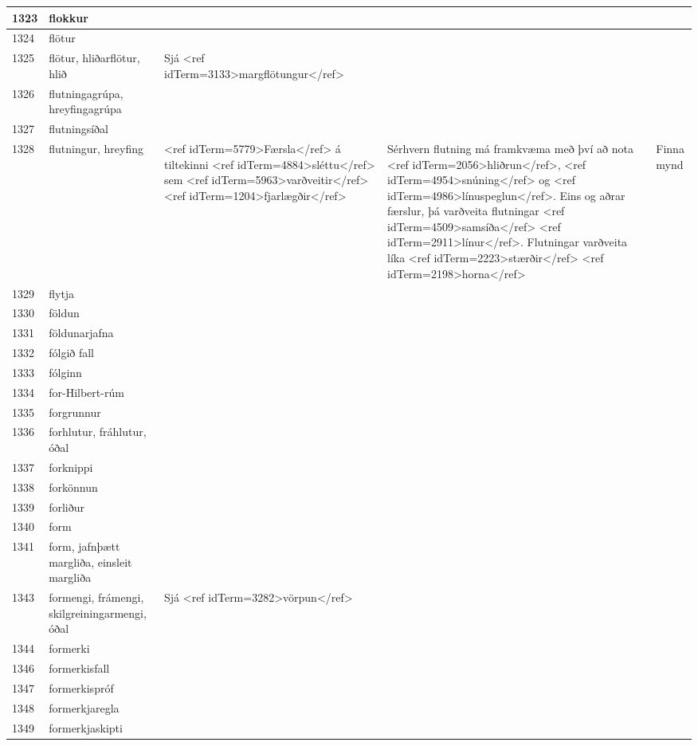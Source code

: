 \begin{longtable}{p{}|p{}|p{}|p{}|p{}}
\hline
1323 & flokkur &  &  &  \\
\hline
1324 & flötur &  &  &  \\
\hline
1325 & flötur, hliðarflötur, hlið & Sjá <ref idTerm=3133>margflötungur</ref> &  &  \\
\hline
1326 & flutningagrúpa, hreyfingagrúpa &  &  &  \\
\hline
1327 & flutningsíðal &  &  &  \\
\hline
1328 & flutningur, hreyfing & <ref idTerm=5779>Færsla</ref> á tiltekinni <ref idTerm=4884>sléttu</ref> sem <ref idTerm=5963>varðveitir</ref> <ref idTerm=1204>fjarlægðir</ref> & Sérhvern flutning má framkvæma með því að nota <ref idTerm=2056>hliðrun</ref>, <ref idTerm=4954>snúning</ref> og <ref idTerm=4986>línuspeglun</ref>. Eins og aðrar færslur, þá varðveita flutningar <ref idTerm=4509>samsíða</ref> <ref idTerm=2911>línur</ref>. Flutningar varðveita líka <ref idTerm=2223>stærðir</ref> <ref idTerm=2198>horna</ref> & Finna mynd \\
\hline
1329 & flytja &  &  &  \\
\hline
1330 & földun &  &  &  \\
\hline
1331 & földunarjafna &  &  &  \\
\hline
1332 & fólgið fall &  &  &  \\
\hline
1333 & fólginn &  &  &  \\
\hline
1334 & for-Hilbert-rúm &  &  &  \\
\hline
1335 & forgrunnur &  &  &  \\
\hline
1336 & forhlutur, fráhlutur, óðal &  &  &  \\
\hline
1337 & forknippi &  &  &  \\
\hline
1338 & forkönnun &  &  &  \\
\hline
1339 & forliður &  &  &  \\
\hline
1340 & form &  &  &  \\
\hline
1341 & form, jafnþætt margliða, einsleit margliða &  &  &  \\
\hline
1343 & formengi, frámengi, skilgreiningarmengi, óðal & Sjá <ref idTerm=3282>vörpun</ref> &  &  \\
\hline
1344 & formerki &  &  &  \\
\hline
1346 & formerkisfall &  &  &  \\
\hline
1347 & formerkispróf &  &  &  \\
\hline
1348 & formerkjaregla &  &  &  \\
\hline
1349 & formerkjaskipti &  &  &  \\

\end{longtable}

